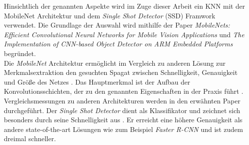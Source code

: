 		Hinsichtlich der genannten Aspekte wird im Zuge dieser Arbeit ein KNN mit der MobileNet Architektur und dem \textit{Single Shot Detector} (SSD) Framwork verwendet. Die Grundlage der Auswahl wird mithilfe der Paper \textit{MobileNets: Efficient Convolutional Neural Networks for Mobile Vision Applications} \cite{mobilenets} und \textit{The Implementation of CNN-based Object Detector on ARM Embedded Platforms} \cite{embedded} begründet.\\
		
		Die \textit{MobileNet} Architektur ermöglicht im Vergleich zu anderen Lösung zur Merkmalsextraktion den gesuchten Spagat zwischen Schnelligkeit, Genauigkeit und Größe des Netzes \cite{mobilenets}. Das Hauptmerkmal ist der Aufbau der Konvolutionsschichten, der zu den genannten Eigenschaften in der Praxis führt \cite{mobilenets} \cite{embedded}. Vergleichsmessungen zu anderen Architekturen werden in den erwähnten Paper durchgeführt. Der \textit{Single Shot Detector} dient als Klassifikator und zeichnet sich besonders durch seine Schnelligkeit aus \cite{ssd}. Er erreicht eine höhere Genauigkeit als andere state-of-the-art Lösungen wie zum Beispiel \textit{Faster R-CNN} \cite{fasterrcnn} und ist zudem dreimal schneller\cite{ssd}.
		

